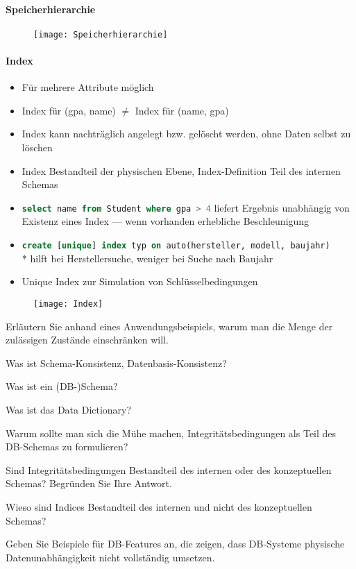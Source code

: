 \paragraph{Speicherhierarchie}
\begin{figure}[H]\centering\label{Speicherhierarchie}\texttt{[image: Speicherhierarchie]}\end{figure}

\paragraph{Index}
\begin{itemize}
	\item Für mehrere Attribute möglich
	\item Index für (gpa, name) \( \neq \) Index für (name, gpa)
	\item Index kann nachträglich angelegt bzw. gelöscht werden, ohne Daten selbst zu löschen
	\item Index Bestandteil der physischen Ebene, Index-Definition Teil des internen Schemas
	\item \lstinline[language=sql]{select name from Student where gpa > 4} liefert Ergebnis unabhängig von Existenz eines Index --- wenn vorhanden erhebliche Beschleunigung
	\item \lstinline[language=sql]{create [unique] index typ on auto(hersteller, modell, baujahr)} \\* hilft bei Herstellersuche, weniger bei Suche nach Baujahr
	\item Unique Index zur Simulation von Schlüsselbedingungen
\end{itemize}
\begin{figure}[H]\centering\label{Index}\texttt{[image: Index]}\end{figure}

\begin{fragen}
	\item Erläutern Sie anhand eines Anwendungsbeispiels, warum man die Menge der zulässigen Zustände einschränken will.
	\item Was ist Schema-Konsistenz, Datenbasis-Konsistenz?
	\item Was ist ein (DB-)Schema?
	\item Was ist das Data Dictionary?
	\item Warum sollte man sich die Mühe machen, Integritätsbedingungen als Teil des DB-Schemas zu formulieren?
	\item Sind Integritätsbedingungen Bestandteil des internen oder des konzeptuellen Schemas? Begründen Sie Ihre Antwort.
	\item Wieso sind Indices Bestandteil des internen und nicht des konzeptuellen Schemas?
	\item Geben Sie Beispiele für DB-Features an, die zeigen, dass DB-Systeme physische Datenunabhängigkeit nicht vollständig umsetzen.
\end{fragen}